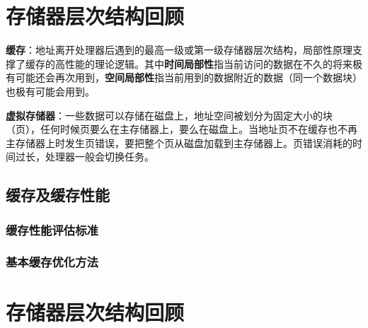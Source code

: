 
\chapter{存储器层次结构回顾}

\textbf{缓存}：地址离开处理器后遇到的最高一级或第一级存储器层次结构，局部性原理支撑了缓存的高性能的理论逻辑。其中\textbf{时间局部性}指当前访问的数据在不久的将来极有可能还会再次用到，\textbf{空间局部性}指当前用到的数据附近的数据（同一个数据块）也极有可能会用到。

\textbf{虚拟存储器}：一些数据可以存储在磁盘上，地址空间被划分为固定大小的块（页），任何时候页要么在主存储器上，要么在磁盘上。当地址页不在缓存也不再主存储器上时发生页错误，要把整个页从磁盘加载到主存储器上。页错误消耗的时间过长，处理器一般会切换任务。
\section{缓存及缓存性能}
\subsection{缓存性能评估标准}
\subsection{基本缓存优化方法}
\chapter{存储器层次结构回顾}





